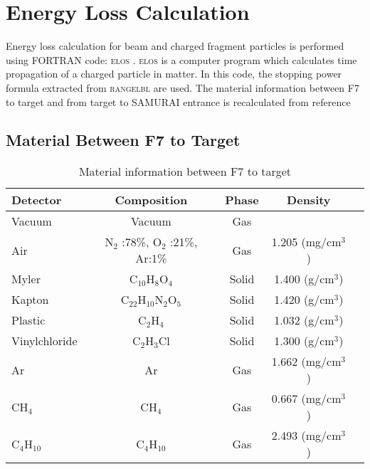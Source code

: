 \chapter{Energy Loss Calculation}
Energy loss calculation for beam and charged fragment particles is performed using FORTRAN code: \textsc{elos} \cite{elos}. \textsc{elos} is a computer program which calculates time propagation of a charged particle in matter. In this code, the stopping power formula extracted from \textsc{rangelbl} \cite{rangelbl} are used. The material information between F7 to target and from target to SAMURAI entrance is recalculated from reference \cite{Dayonewiki} \cite{Ogoshi}

\section{Material Between F7 to Target}
\begin{table}[h]
    \centering
    \begin{tabular}{lcccc}
        \hline
    Detector & Composition & Phase  & Density  \\
    \hline
    Vacuum   & Vacuum & Gas &   \\
    Air      & N$_2$ :78\%, O$_2$ :21\%, Ar:1\% & Gas & 1.205 (mg/cm$^3$) \\
    Myler    & C$_{10}$H$_8$O$_4$ & Solid   & 1.400 (g/cm$^3$)\\
    Kapton   & C$_{22}$H$_{10}$N$_2$O$_5$ & Solid   & 1.420 (g/cm$^3$) \\
    Plastic  & C$_2$H$_4$ & Solid &  1.032 (g/cm$^3$) \\
    Vinylchloride & C$_2$H$_3$Cl & Solid &  1.300 (g/cm$^3$) \\
    Ar       & Ar      & Gas  & 1.662 (mg/cm$^3$) \\
    CH$_4$   & CH$_4$  & Gas  & 0.667 (mg/cm$^3$) \\
    C$_4$H$_{10}$ & C$_4$H$_{10}$ & Gas & 2.493 (mg/cm$^3$) \\
    \hline
    \end{tabular}
    \caption{Material information between F7 to target}
\end{table}

